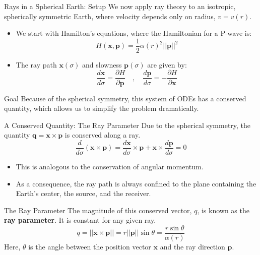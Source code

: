 \documentclass{beamer}
\begin{document}
\begin{frame}{Rays in a Spherical Earth: Setup}
    We now apply ray theory to an isotropic, spherically symmetric Earth, where velocity depends only on radius, $ v = v(r) $.
    \pause
    \begin{itemize}
        \item We start with Hamilton's equations, where the Hamiltonian for a P-wave is:
        $$ H(\mathbf{x}, \mathbf{p}) = \frac{1}{2} \alpha(r)^2 ||\mathbf{p}||^2 $$
        \item The ray path $\mathbf{x}(\sigma)$ and slowness $\mathbf{p}(\sigma)$ are given by:
        $$ \frac{d\mathbf{x}}{d\sigma} = \frac{\partial H}{\partial \mathbf{p}} \quad , \quad \frac{d\mathbf{p}}{d\sigma} = -\frac{\partial H}{\partial \mathbf{x}} $$
    \end{itemize}
    \pause
    \begin{alertblock}{Goal}
        Because of the spherical symmetry, this system of ODEs has a conserved quantity, which allows us to simplify the problem dramatically.
    \end{alertblock}
\end{frame}

\begin{frame}{A Conserved Quantity: The Ray Parameter}
    Due to the spherical symmetry, the quantity $ \mathbf{q} = \mathbf{x} \times \mathbf{p} $ is conserved along a ray.
    $$ \frac{d}{d\sigma}(\mathbf{x}\times \mathbf{p}) = \frac{d\mathbf{x}}{d\sigma}\times \mathbf{p} + \mathbf{x}\times\frac{d\mathbf{p}}{d\sigma} = 0 $$
    \pause
    \begin{itemize}
        \item This is analogous to the conservation of angular momentum.
        \item As a consequence, the ray path is always confined to the plane containing the Earth's center, the source, and the receiver.
    \end{itemize}
    \pause
    \begin{block}{The Ray Parameter}
        The magnitude of this conserved vector, $q$, is known as the \textbf{ray parameter}. It is constant for any given ray.
        $$ q = ||\mathbf{x} \times \mathbf{p}|| = r ||\mathbf{p}|| \sin \theta = \frac{r \sin\theta}{\alpha(r)} $$
        Here, $\theta$ is the angle between the position vector $\mathbf{x}$ and the ray direction $\mathbf{p}$.
    \end{block}
\end{frame}
\end{document}

